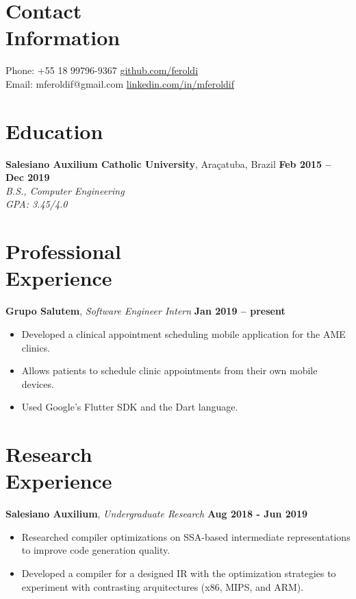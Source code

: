 \documentclass[margin,line]{resume}
\begin{document}
\begin{resume}
    \section{\mysidestyle Contact\\Information}

    Phone: +55 18 99796-9367 \hfill \url{github.com/feroldi}\\
    \noindent Email: mferoldif@gmail.com \hfill \url{linkedin.com/in/mferoldif}

    \section{\mysidestyle Education}

    \textbf{Salesiano Auxilium Catholic University}, Araçatuba, Brazil \hfill \textbf{Feb 2015 -- Dec 2019}\\
    \textsl{B.S., Computer Engineering}\\
    \textsl{GPA: 3.45/4.0}

    \section{\mysidestyle Professional\\Experience}

    \textbf{Grupo Salutem}, \textit{Software Engineer Intern} \hfill \textbf{Jan 2019 -- present}
    \begin{itemize}
        \item Developed a clinical appointment scheduling mobile application for the AME clinics.
        \item Allows patients to schedule clinic appointments from their own mobile devices.
        \item Used Google's Flutter SDK and the Dart language.
    \end{itemize}

    \section{\mysidestyle Research\\Experience}

    \textbf{Salesiano Auxilium}, \textsl{Undergraduate Research} \hfill \textbf{Aug 2018 - Jun 2019}
    \begin{itemize}
        \item Researched compiler optimizations on SSA-based intermediate representations to improve code generation quality.
        \item Developed a compiler for a designed IR with the optimization strategies to experiment with contrasting arquitectures (x86, MIPS, and ARM).
    \end{itemize}


\end{resume}
\end{document}
